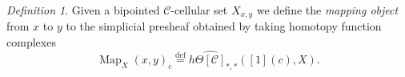 \documentclass[leqno]{article}
\numberwithin{equation}{subsection}
\theoremstyle{plain}   %
\newtheorem{prop}[equation]{Proposition}
\theoremstyle{remark}
\newtheorem{defn}[equation]{Definition}
\theoremstyle{plain}
\DeclareMathOperator{\Ob}{Ob}
\DeclareMathOperator{\Map}{Map}
\renewcommand{\C}{\ensuremath{\mathcal{C}}}
\newcommand{\defeq}{\overset{\mathrm{def}}=}
\newcommand{\cellset}{\ensuremath{\widehat{\Theta[\mathcal{C}]}}}
\begin{document}
\begin{defn}
	Given a bipointed \(\C\)-cellular set \(X_{x,y}\) we define the \emph{mapping object} from \(x\) to \(y\) to the simplicial presheaf obtained by taking homotopy function complexes
	\[\Map_X(x,y)_c\defeq h\cellset_{\ast,\ast}([1](c), X).\]
\end{defn}
\begin{comment}
	We define a slightly modified version for special maps.

	\begin{defn}
		If \(G\) is a gadget, let \(\mathcal{G}\) denote the category of all gadgets with special maps between them.  Then we 	define the \emph{special mapping object} to be \[\Map^\mathbf{sp}_G(\alpha,\omega)_c=\mathcal{G}(C^\bullet_R(c),G(c)).\]
	\end{defn}

	\begin{prop}\label{goodgadgets}
		Given a necklace gadget \(T\), the special mapping object \[\Map^\mathbf{sp}_T(\alpha,\omega)\] is contractible.
	\end{prop}
	\begin{proof}
		Since \(T(c)\hookrightarrow \Delta[T](c)\) is a horizontal inner-anodyne and \(\Delta[T](c)\) is fibrant, we can compute \	(\Map^\mathbf{sp}_{T(c)}(\alpha,\omega)\) by the formula 
		\[\Map^\mathbf{sp}_T(\alpha,\omega)_{k,c} = \mathcal{G}(C_R^k(c),\Delta[T](c))\]
		but every map \(C^k_R(c)\to \Delta[T](c)\) factors through the map \(C^n_R(c)\to [1](c),\) and the only special map \([1]	(c)\to \Delta[T](c)\) is the one that maps \(c\) into \(c\times \dots \times c\) via the diagonal.
	\end{proof}

	\section{Comparing \(\mathfrak{C}(X)(x,y)\) with \(\Map_X(x,y)\)}

	We begin by defining a special category of gadgets \(\mathcal{Y}\), which is the full subcategory of the category of all 	gadgets whose objects are those gadgets \(G\) such that \(\Map_G(\alpha,\omega)\) is contractible.

	In particular, by Proposition \ref{goodgadgets}, we see that every necklace gadget belongs to this category, so it is indeed 	a category of gadgets.  We define a full subcategory \(\mathcal{Y}_{\mathrm{f}}\subseteq \mathcal{Y}\) to be the full 	subcategory of \(\mathcal{Y}\) spanned by the gadgets \(G\) such that \(G(c)\) is fibrant for all \(c\in \Ob \C\).


\end{comment}
\end{document}
